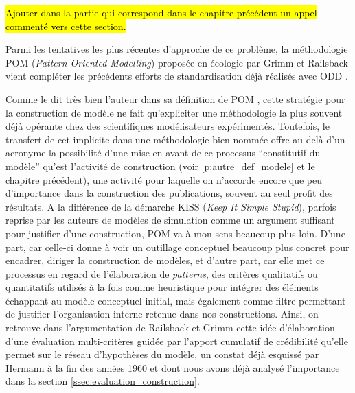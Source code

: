 
\hl{Ajouter dans la partie qui correspond dans le chapitre précédent un appel commenté vers cette section.}

Parmi les tentatives les plus récentes d'approche de ce problème, la méthodologie POM (\textit{Pattern Oriented Modelling}) \autocites{Grimm2005,Grimm2011} proposée en écologie par Grimm et Railsback vient compléter les précédents efforts de standardisation déjà réalisés avec ODD \autocite{Grimm2010}. 

Comme le dit très bien l'auteur dans sa définition de POM , cette stratégie pour la construction de modèle ne fait qu'expliciter une méthodologie la plus souvent déjà opérante chez des scientifiques modélisateurs expérimentés. Toutefois, le transfert de cet implicite dans une méthodologie bien nommée offre au-delà d'un acronyme la possibilité d'une mise en avant de ce processus \enquote{constitutif du modèle} qu'est l'activité de construction (voir \ref{p:autre_def_modele} et le chapitre précédent), une activité pour laquelle on n'accorde encore que peu d'importance dans la construction des publications, souvent au seul profit des résultats. A la différence de la démarche KISS (\textit{Keep It Simple Stupid}), parfois reprise par les auteurs de modèles de simulation comme un argument suffisant pour justifier d'une construction, POM va à mon sens beaucoup plus loin. D'une part, car celle-ci donne à voir un outillage conceptuel beaucoup plus concret pour encadrer, diriger la construction de modèles, et d'autre part, car elle met ce processus en regard de l'élaboration de \textit{patterns}, des critères qualitatifs ou quantitatifs utilisés à la fois comme heuristique pour intégrer des éléments échappant au modèle conceptuel initial, mais également comme filtre permettant de justifier l'organisation interne retenue dans nos constructions. Ainsi, on retrouve dans l'argumentation de Railsback et Grimm cette idée d'élaboration d'une évaluation multi-critères guidée par l'apport cumulatif de crédibilité qu'elle permet sur le réseau d'hypothèses du modèle, un constat déjà esquissé par Hermann à la fin des années 1960 et dont nous avons déjà analysé l'importance dans la section \ref{ssec:evaluation_construction}. 

